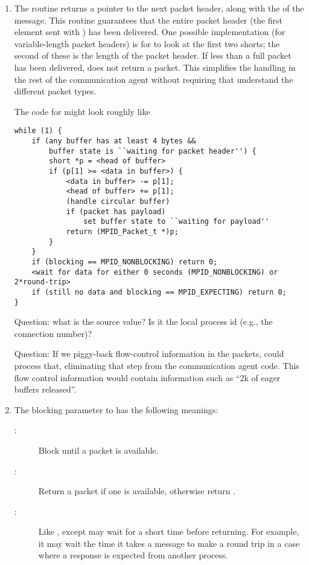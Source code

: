 \begin{enumerate}
\item The routine  returns a pointer to the next
  packet header, along with the  of the message.  This routine
  guarantees 
  that the entire packet header (the first  element sent with
  ) has been delivered.  
  One possible implementation (for variable-length packet headers) is for
   to look at the 
  first two shorts; the second of these is the length of the packet header.
  If less than a full packet has been delivered, 
  does not 
  return a packet.  This simplifies the handling in the rest of the
  communication agent without requiring that 
  understand the different packet types.

  The code for  might look roughly like
\begin{verbatim}
while (1) {
    if (any buffer has at least 4 bytes &&
        buffer state is ``waiting for packet header'') {
        short *p = <head of buffer>
        if (p[1] >= <data in buffer>) {
            <data in buffer> -= p[1];
            <head of buffer> += p[1];
            (handle circular buffer)
            if (packet has payload)
                set buffer state to ``waiting for payload''
            return (MPID_Packet_t *)p;
        }
    }
    if (blocking == MPID_NONBLOCKING) return 0;
    <wait for data for either 0 seconds (MPID_NONBLOCKING) or 2*round-trip>
    if (still no data and blocking == MPID_EXPECTING) return 0;
}
\end{verbatim}

  Question: what is the source value?  Is it the local process id (e.g., the
  connection number)?

  Question: If we piggy-back flow-control information in the packets,
   could process that, eliminating that step from the
  communication agent code.  This flow control information would contain
  information such as ``2k of eager buffers released''.

\item The blocking parameter to  has the following
  meanings:
  \begin{description}
  \item[:]Block until a packet is available.
  \item[:]Return a packet if one is available, otherwise
    return .
  \item[:]Like , except
     may wait for a short time before returning.  For
    example, it may wait the time it takes a message to make a round trip in a
    case where a response is expected from another process.
  \end{description}


\end{enumerate}

